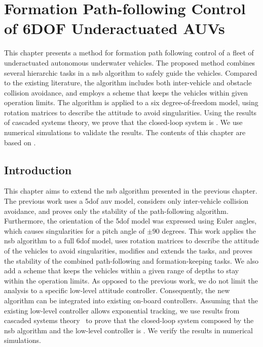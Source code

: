 \chapter{Formation Path-following Control of 6DOF Underactuated AUVs}
\label{chap:NSB_R}

This chapter presents a method for formation path following control of a fleet of underactuated autonomous underwater vehicles.
The proposed method combines several hierarchic tasks in a \acrlong{nsb} algorithm to safely guide the vehicles.
Compared to the existing literature, the algorithm includes both inter-vehicle and obstacle collision avoidance, and employs a scheme that keeps the vehicles within given operation limits.
The algorithm is applied to a six degree-of-freedom model, using rotation matrices to describe the attitude to avoid singularities.
Using the results of cascaded systems theory, we prove that the closed-loop system is .
We use numerical simulations to validate the results.
The contents of this chapter are based on \cite{matous_singularity_2023}.

\section{Introduction}

This chapter aims to extend the \gls{nsb} algorithm presented in the previous chapter.
The previous work uses a 5\gls{dof} \gls{auv} model, considers only inter-vehicle collision avoidance, and proves only the stability of the path-following algorithm.
Furthermore, the orientation of the 5\gls{dof} model was expressed using Euler angles, which causes singularities for a pitch angle of $\pm90$ degrees.
This work applies the \gls{nsb} algorithm to a full 6\gls{dof} model, uses rotation matrices to describe the attitude of the vehicles to avoid singularities, modifies and extends the tasks, and proves the stability of the combined path-following and formation-keeping tasks.
We also add a scheme that keeps the vehicles within a given range of depths to stay within the operation limits.
As opposed to the previous work, we do not limit the analysis to a specific low-level attitude controller.
Consequently, the new algorithm can be integrated into existing on-board controllers.
Assuming that the existing low-level controller allows exponential tracking, we use results from cascaded systems theory~\cite{pettersen_lyapunov_2017} to prove that the closed-loop system composed by the \gls{nsb} algorithm and the low-level controller is .
We verify the results in numerical simulations.


